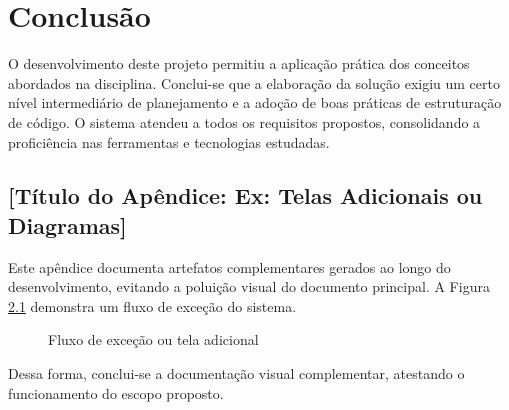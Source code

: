 \documentclass[
    12pt,
    openright,
    oneside,
    a4paper,
    english,
    french,
    spanish,
    brazil
]{abntex2}
\begin{document}
\chapter{Conclusão}
O desenvolvimento deste projeto permitiu a aplicação prática dos conceitos abordados na disciplina. Conclui-se que a elaboração da solução exigiu um certo nível intermediário de planejamento e a adoção de boas práticas de estruturação de código. O sistema atendeu a todos os requisitos propostos, consolidando a proficiência nas ferramentas e tecnologias estudadas.

\postextual

 

\begin{apendicesenv}
\partapendices

\chapter{[Título do Apêndice: Ex: Telas Adicionais ou Diagramas]}
\label{apendice:telas}

Este apêndice documenta artefatos complementares gerados ao longo do desenvolvimento, evitando a poluição visual do documento principal. A Figura \ref{fig:apendice_extra} demonstra um fluxo de exceção do sistema.

\begin{figure}[htb]
    \centering
    \caption{Fluxo de exceção ou tela adicional}
    \label{fig:apendice_extra}
    \fbox{\rule{0pt}{2in} \rule{0.9\textwidth}{0pt}} %
\end{figure}

Dessa forma, conclui-se a documentação visual complementar, atestando o funcionamento do escopo proposto.

\end{apendicesenv}
\end{document}
